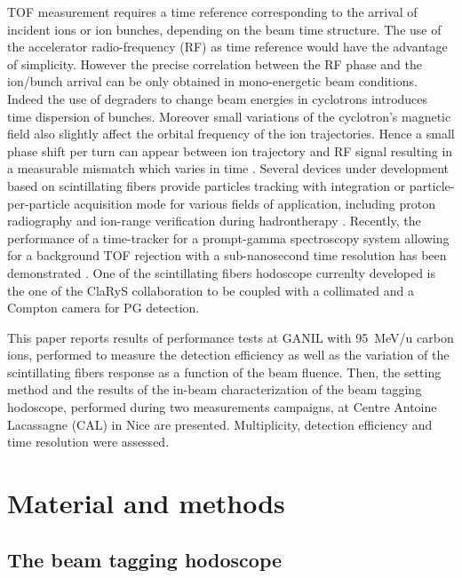 \documentclass[a4paper,11pt]{article}
\begin{document}
TOF measurement requires a time reference corresponding to the arrival of incident ions or ion bunches, depending on the beam time structure. The use of the accelerator radio-frequency (RF) as time reference would have the advantage of simplicity. However the precise correlation between the RF phase and the ion/bunch arrival can be only obtained in mono-energetic beam conditions. 
Indeed the use of degraders to change beam energies in cyclotrons introduces time dispersion of bunches. Moreover small variations of the cyclotron’s magnetic field also slightly affect the orbital frequency of the ion trajectories. Hence a small phase shift per turn can appear between ion trajectory and RF signal resulting in a measurable mismatch which varies in time \cite{Werner2019}. 
Several devices under development based on scintillating fibers provide particles tracking with integration \cite{Leverington2018} or particle-per-particle \cite{Horikawa2004, Achenbach2008, Braccini2012} acquisition mode for various fields of application, including proton radiography \cite{Presti2013} and ion-range verification during hadrontherapy \cite{PAPA2016}. Recently, the performance of a time-tracker for a prompt-gamma spectroscopy system allowing for a background TOF rejection with a sub-nanosecond time resolution has been demonstrated \cite{Martins2020}. One of the scintillating fibers hodoscope currenlty developed is the one of the ClaRyS collaboration to be coupled with a collimated and a Compton camera for PG detection.

This paper reports results of performance tests at GANIL with 95~MeV/u carbon ions, performed to measure the detection efficiency as well as the variation of the scintillating fibers response as a function of the beam fluence. Then, the setting method and the results of the in-beam characterization of the beam tagging hodoscope, performed during two measurements campaigns, at Centre Antoine Lacassagne (CAL) in Nice are presented. Multiplicity, detection efficiency and time resolution were assessed.

\section{Material and methods}
\subsection{The beam tagging hodoscope}
\end{document}

